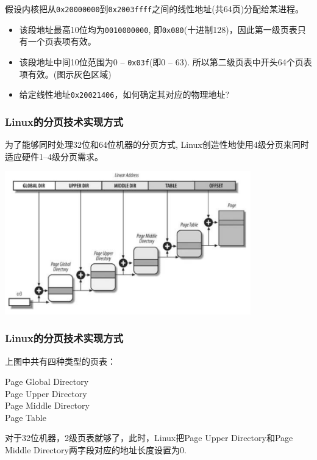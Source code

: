 \documentclass[xcolor=svgnames]{beamer}
\begin{document}
\begin{CJK*}{UTF8}{gbsn}
\begin{frame}[fragile]
假设内核把从\verb|0x20000000|到\verb|0x2003ffff|之间的线性地址(共64页)分配给某进程。
\begin{itemize}
\item 该段地址最高10位均为\verb|0010000000|, 即\verb|0x080|(十进制128)，因此第一级页表只有一个页表项有效。
\item 该段地址中间10位范围为0 -- \verb|0x03f|(即0 -- 63). 所以第二级页表中开头64个页表项有效。(图示灰色区域)
\item 给定线性地址\verb|0x20021406|，如何确定其对应的物理地址?
\end{itemize}

\end{frame}

\begin{frame}[fragile]
\frametitle{Linux的分页技术实现方式}
为了能够同时处理32位和64位机器的分页方式, Linux创造性地使用4级分页来同时适应硬件1--4级分页需求。

\includegraphics[width=0.8\textwidth]{linuxpaging.png}
\end{frame}

\begin{frame}[fragile]
\frametitle{Linux的分页技术实现方式}
上图中共有四种类型的页表：
\begin{description}
\item[Page Global Directory]
\item[Page Upper Directory]
\item[Page Middle Directory]
\item[Page Table]
\end{description}
对于32位机器，2级页表就够了，此时，Linux把Page Upper Directory和Page Middle Directory两字段对应的地址长度设置为0.

\end{frame}


\end{CJK*}
\end{document}
